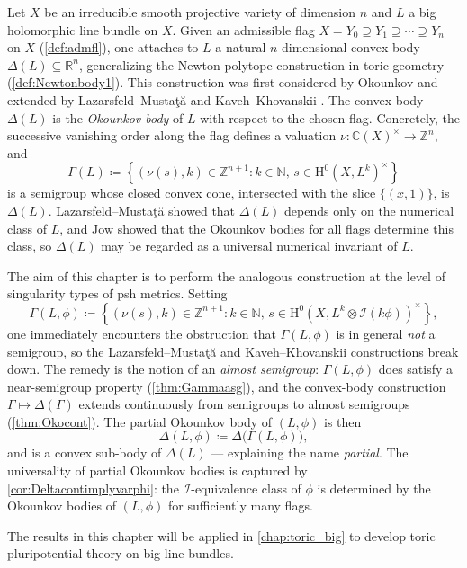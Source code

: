 Let $X$ be an irreducible smooth projective variety of dimension $n$ and $L$ a big holomorphic line bundle on $X$. Given an admissible flag $X=Y_0\supseteq Y_1\supseteq \cdots\supseteq Y_n$ on $X$ (\cref{def:admfl}), one attaches to $L$ a natural $n$-dimensional convex body $\Delta(L)\subseteq \mathbb{R}^n$, generalizing the Newton polytope construction in toric geometry (\cref{def:Newtonbody1}). This construction was first considered by Okounkov \cite{Oko96, Oko03} and extended by Lazarsfeld--Musta\c{t}\u{a} \cite{LM09} and Kaveh--Khovanskii \cite{KK12}. The convex body $\Delta(L)$ is the \emph{Okounkov body} of $L$ with respect to the chosen flag. Concretely, the successive vanishing order along the flag defines a valuation $\nu\colon \mathbb{C}(X)^{\times}\to \mathbb{Z}^n$, and
\[
\Gamma(L)\coloneqq \left\{(\nu(s),k)\in \mathbb{Z}^{n+1}:k\in \mathbb{N},\, s\in \mathrm{H}^0(X,L^k)^{\times} \right\}
\]
is a semigroup whose closed convex cone, intersected with the slice $\{(x,1)\}$, is $\Delta(L)$. Lazarsfeld--Musta\c{t}\u{a} \cite{LM09} showed that $\Delta(L)$ depends only on the numerical class of $L$, and Jow \cite{Jow10} showed that the Okounkov bodies for all flags determine this class, so $\Delta(L)$ may be regarded as a universal numerical invariant of $L$.

The aim of this chapter is to perform the analogous construction at the level of singularity types of psh metrics. Setting
\[
\Gamma(L,\phi)\coloneqq \left\{(\nu(s),k)\in \mathbb{Z}^{n+1}:k\in \mathbb{N},\, s\in \mathrm{H}^0(X,L^k\otimes \mathcal{I}(k\phi))^{\times} \right\},
\]
one immediately encounters the obstruction that $\Gamma(L,\phi)$ is in general \emph{not} a semigroup, so the Lazarsfeld--Musta\c{t}\u{a} and Kaveh--Khovanskii constructions break down. The remedy is the notion of an \emph{almost semigroup}: $\Gamma(L,\phi)$ does satisfy a near-semigroup property (\cref{thm:Gammaasg}), and the convex-body construction $\Gamma\mapsto \Delta(\Gamma)$ extends continuously from semigroups to almost semigroups (\cref{thm:Okocont}). The partial Okounkov body of $(L,\phi)$ is then
\[
\Delta(L,\phi)\coloneqq \Delta\bigl(\Gamma(L,\phi)\bigr),
\]
and is a convex sub-body of $\Delta(L)$ --- explaining the name \emph{partial}.
The universality of partial Okounkov bodies is captured by \cref{cor:Deltacontimplyvarphi}: the $\mathcal{I}$-equivalence class of $\phi$ is determined by the Okounkov bodies of $(L,\phi)$ for sufficiently many flags.

The results in this chapter will be applied in \cref{chap:toric_big} to develop toric pluripotential theory on big line bundles.



